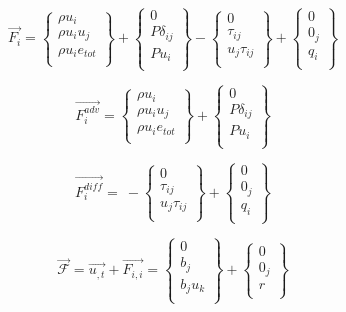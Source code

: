 \documentclass{article}
\begin{document}
\begin{equation}
\vec{F_i}=
\begin{Bmatrix}
\rho u_i\\
\rho u_iu_j\\
\rho u_ie_{tot}\\
\end{Bmatrix}+
\begin{Bmatrix}
0\\
P\delta _{ij}\\
Pu_i\\
\end{Bmatrix}-
\begin{Bmatrix}
0\\ \tau _{ij}\\ u_j\tau _{ij}\\
\end{Bmatrix}+
\begin{Bmatrix}
0\\ 0_j\\q_i\\
\end{Bmatrix}
\end{equation}

\begin{equation}
\vec{F_i^{adv}}=
\begin{Bmatrix}
\rho u_i\\
\rho u_iu_j\\
\rho u_ie_{tot}\\
\end{Bmatrix}+
\begin{Bmatrix}
0\\
P\delta _{ij}\\
Pu_i\\
\end{Bmatrix}
\end{equation}

\begin{equation}
\vec{F_i^{diff}}=~-
\begin{Bmatrix}
0\\ \tau _{ij}\\ u_j\tau _{ij}\\
\end{Bmatrix}+
\begin{Bmatrix}
0\\ 0_j\\q_i\\
\end{Bmatrix}
\end{equation}

\begin{equation}
\vec{\mathscr{F}}=\vec{u_{,t}}+\vec{F_{i,i}}=
\begin{Bmatrix}
0\\ b _j\\ b_ju _k\\
\end{Bmatrix}+
\begin{Bmatrix}
0\\ 0_j\\r\\
\end{Bmatrix}
\end{equation}
\end{document}

